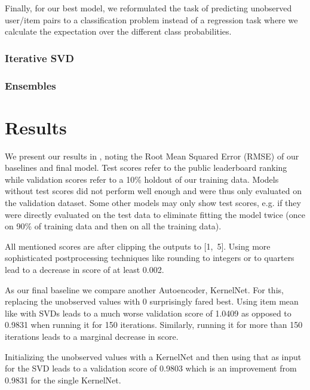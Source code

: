 \documentclass[10pt,conference,compsocconf]{IEEEtran}
\begin{document}
    Finally, for our best model, we reformulated the task of predicting unobserved user/item pairs to a classification problem instead of a regression task where we calculate the expectation over the different class probabilities.

    \subsubsection{Iterative SVD}

    \subsubsection{Ensembles}


    \section{Results}
    We present our results in , noting the Root Mean Squared Error (RMSE) of our baselines and final model.
    Test scores refer to the public leaderboard ranking while validation scores refer to a 10\% holdout of our training data.
    Models without test scores did not perform well enough and were thus only evaluated on the validation dataset.
    Some other models may only show test scores, e.g. if they were directly evaluated on the test data to eliminate
    fitting the model twice (once on 90\% of training data and then on all the training data).

    All mentioned scores are after clipping the outputs to [1,~5].
    Using more sophisticated postprocessing techniques like rounding to integers or to quarters lead to a decrease in score of at least 0.002.



    As our final baseline we compare another Autoencoder, KernelNet.
    For this, replacing the unobserved values with 0 surprisingly fared best.
    Using item mean like with SVDs leads to a much worse validation score of 1.0409 as opposed to 0.9831 when running it for 150 iterations.
    Similarly, running it for more than 150 iterations leads to a marginal decrease in score.

    Initializing the unobserved values with a KernelNet and then using that as input for the SVD leads to a validation score of 0.9803 which is an improvement from 0.9831 for the single KernelNet.
\end{document}
